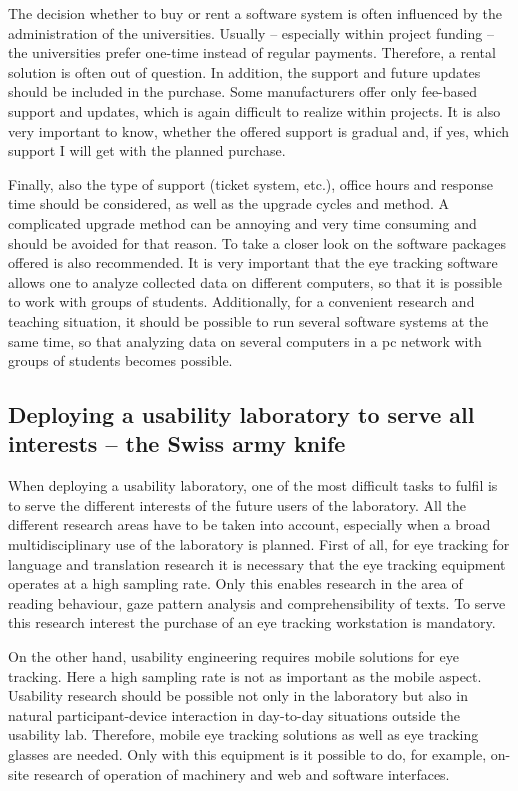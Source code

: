 \documentclass[output=paper]{langsci/langscibook}
\begin{document}
The decision whether to buy or rent a software system is often influenced by the administration of the universities. Usually -- especially within project funding -- the universities prefer one-time instead of regular payments. Therefore, a rental solution is often out of question. In addition, the support and future updates should be included in the purchase. Some manufacturers offer only fee-based support and updates, which is again difficult to realize within projects. It is also very important to know, whether the offered support is gradual and, if yes, which support I will get with the planned purchase.


Finally, also the type of support (ticket system, etc.), office hours and response time should be considered, as well as the upgrade cycles and method. A complicated upgrade method can be annoying and very time consuming and should be avoided for that reason. To take a closer look on the software packages offered is also recommended. It is very important that the eye tracking software allows one to analyze collected data on different computers, so that it is possible to work with groups of students. Additionally, for a convenient research and teaching situation, it should be possible to run several software systems at the same time, so that analyzing data on several computers in a pc network with groups of students becomes possible.


\subsection{Deploying a usability laboratory to serve all interests -- the Swiss army knife }

When deploying a usability laboratory, one of the most difficult tasks to fulfil is to serve the different interests of the future users of the laboratory. All the different research areas have to be taken into account, especially when a broad multidisciplinary use of the laboratory is planned. First of all, for eye tracking for language and translation research it is necessary that the eye tracking equipment operates at a high sampling rate. Only this enables research in the area of reading behaviour, gaze pattern analysis and comprehensibility of texts. To serve this research interest the purchase of an eye tracking workstation is mandatory.


On the other hand, usability engineering requires mobile solutions for eye tracking. Here a high sampling rate is not as important as the mobile aspect. Usability research should be possible not only in the laboratory but also in natural participant-device interaction in day-to-day situations outside the usability lab. Therefore, mobile eye tracking solutions as well as eye tracking glasses are needed. Only with this equipment is it possible to do, for example, on-site research of operation of machinery and web and software interfaces. 
\end{document}
